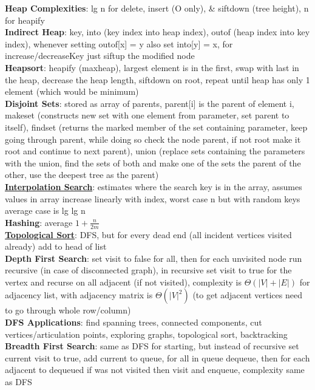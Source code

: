 \documentclass[a4paper]{article}
\begin{document}
\begin{multicols}{2}
        \textbf{Heap Complexities}: lg n for delete, insert (O only), \& siftdown (tree height), n for heapify\\
        \textbf{Indirect Heap}: key, into (key index into heap index), outof (heap index into key index), whenever setting outof[x] = y also set into[y] = x, for increase/decreaseKey just siftup the modified node\\
        \textbf{Heapsort}: heapify (maxheap), largest element is in the first, swap with last in the heap, decrease the heap length, siftdown on root, repeat until heap has only 1 element (which would be minimum)\\
        \textbf{Disjoint Sets}: stored as array of parents, parent[i] is the parent of element i, makeset (constructs new set with one element from parameter, set parent to itself), findset (returns the marked member of the set containing parameter, keep going through parent, while doing so check the node parent, if not root make it root and continue to next parent), union (replace sets containing the parameters with the union, find the sets of both and make one of the sets the parent of the other, use the deepest tree as the parent)\\
        \underline{\textbf{Interpolation Search}}: estimates where the search key is in the array, assumes values in array increase linearly with index, worst case n but with random keys average case is lg lg n\\
        \textbf{Hashing}: average $1 + \frac{n}{2m}$\\
        \underline{\textbf{Topological Sort}}: DFS, but for every dead end (all incident vertices visited already) add to head of list\\
        \textbf{Depth First Search}: set visit to false for all, then for each unvisited node run recursive (in case of disconnected graph), in recursive set visit to true for the vertex and recurse on all adjacent (if not visited), complexity is $\Theta (|V| + |E|)$ for adjacency list, with adjacency matrix is $\Theta (|V|^2)$ (to get adjacent vertices need to go through whole row/column)\\
        \textbf{DFS Applications}: find spanning trees, connected components, cut vertices/articulation points, exploring graphs, topological sort, backtracking\\
        \textbf{Breadth First Search}: same as DFS for starting, but instead of recursive set current visit to true, add current to queue, for all in queue dequeue, then for each adjacent to dequeued if was not visited then visit and enqueue, complexity same as DFS\\

\end{multicols}
\end{document}
